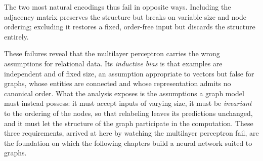 The two most natural encodings thus fail in opposite ways. Including the
adjacency matrix preserves the structure but breaks on variable size and node
ordering; excluding it restores a fixed, order-free input but discards the
structure entirely.

These failures reveal that the multilayer perceptron carries the wrong
assumptions for relational data. Its \textit{inductive bias} is that examples
are independent and of fixed size, an assumption appropriate to vectors but
false for graphs, whose entities are connected and whose representation admits
no canonical order. What the analysis exposes is the assumptions a
graph model must instead possess: it must accept inputs of varying size, it
must be \textit{invariant} to the ordering of the nodes, so that relabeling
leaves its predictions unchanged, and it must let the structure of the graph
participate in the computation. These three requirements, arrived at here by
watching the multilayer perceptron fail, are the foundation on which the following
chapters build a neural network suited to graphs.